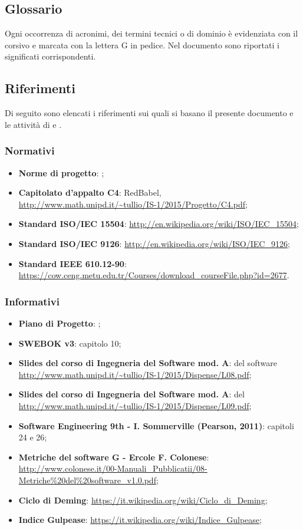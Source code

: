 \subsection{Glossario}
Ogni occorrenza di acronimi, dei termini tecnici o di dominio è evidenziata con il corsivo e marcata con la lettera G in pedice. Nel documento \Glossario  sono riportati i significati corrispondenti.

\subsection{Riferimenti}
Di seguito  sono elencati i riferimenti sui quali si basano il presente documento e le attività di  e .

\subsubsection{Normativi}
\begin{itemize}
\item \textbf{Norme di progetto}: \NormeDiProgetto;
\item \textbf{Capitolato d'appalto C4}: RedBabel,  \url{http://www.math.unipd.it/~tullio/IS-1/2015/Progetto/C4.pdf};
\item \textbf{Standard ISO/IEC 15504}: \url{http://en.wikipedia.org/wiki/ISO/IEC_15504};
\item \textbf{Standard ISO/IEC 9126}: \url{http://en.wikipedia.org/wiki/ISO/IEC_9126};
\item \textbf{Standard IEEE 610.12-90}: \url{https://cow.ceng.metu.edu.tr/Courses/download_courseFile.php?id=2677}.
\end{itemize}
	
\subsubsection{Informativi}
\begin{itemize}
\item \textbf{Piano di Progetto}: \PianoDiProgetto;
\item \textbf{SWEBOK v3}: capitolo 10;
\item \textbf{Slides del corso di Ingegneria del Software mod. A}:  del software \url{http://www.math.unipd.it/~tullio/IS-1/2015/Dispense/L08.pdf};
\item \textbf{Slides del corso di Ingegneria del Software mod. A}:  del  \url{http://www.math.unipd.it/~tullio/IS-1/2015/Dispense/L09.pdf};
\item \textbf{Software Engineering 9th - I. Sommerville (Pearson, 2011)}: capitoli 24 e 26;
\item \textbf{Metriche del software G - Ercole F. Colonese}: \url{http://www.colonese.it/00-Manuali_Pubblicatii/08-Metriche%20del%20software_v1.0.pdf};
\item \textbf{Ciclo di Deming}: \url{https://it.wikipedia.org/wiki/Ciclo_di_Deming};
\item \textbf{Indice Gulpease}: \url{https://it.wikipedia.org/wiki/Indice_Gulpease};
\end{itemize}
